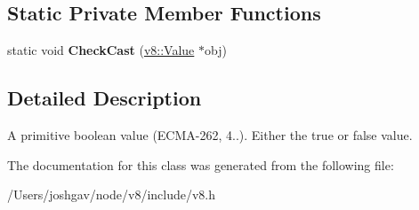 \subsection*{Static Private Member Functions}
\begin{DoxyCompactItemize}
\item 
static void {\bfseries Check\+Cast} (\hyperlink{classv8_1_1_value}{v8\+::\+Value} $\ast$obj)\hypertarget{classv8_1_1_boolean_ae8e7c3ba7105247904cb12dfa13d13af}{}\label{classv8_1_1_boolean_ae8e7c3ba7105247904cb12dfa13d13af}

\end{DoxyCompactItemize}


\subsection{Detailed Description}
A primitive boolean value (E\+C\+M\+A-\/262, 4..). Either the true or false value. 

The documentation for this class was generated from the following file\+:\begin{DoxyCompactItemize}
\item 
/\+Users/joshgav/node/v8/include/v8.\+h\end{DoxyCompactItemize}
